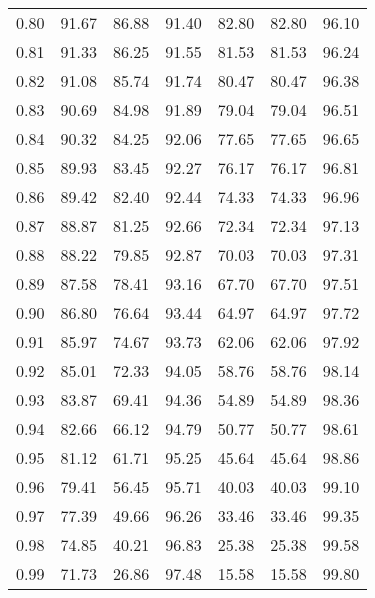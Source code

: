 \begin{tabular}{|c|c|c|c|c|c|c|}
      0.80 &     91.67 &     86.88 &      91.40 &   82.80 &      82.80 &         96.10 \\
      0.81 &     91.33 &     86.25 &      91.55 &   81.53 &      81.53 &         96.24 \\
      0.82 &     91.08 &     85.74 &      91.74 &   80.47 &      80.47 &         96.38 \\
      0.83 &     90.69 &     84.98 &      91.89 &   79.04 &      79.04 &         96.51 \\
      0.84 &     90.32 &     84.25 &      92.06 &   77.65 &      77.65 &         96.65 \\
      0.85 &     89.93 &     83.45 &      92.27 &   76.17 &      76.17 &         96.81 \\
      0.86 &     89.42 &     82.40 &      92.44 &   74.33 &      74.33 &         96.96 \\
      0.87 &     88.87 &     81.25 &      92.66 &   72.34 &      72.34 &         97.13 \\
      0.88 &     88.22 &     79.85 &      92.87 &   70.03 &      70.03 &         97.31 \\
      0.89 &     87.58 &     78.41 &      93.16 &   67.70 &      67.70 &         97.51 \\
      0.90 &     86.80 &     76.64 &      93.44 &   64.97 &      64.97 &         97.72 \\
      0.91 &     85.97 &     74.67 &      93.73 &   62.06 &      62.06 &         97.92 \\
      0.92 &     85.01 &     72.33 &      94.05 &   58.76 &      58.76 &         98.14 \\
      0.93 &     83.87 &     69.41 &      94.36 &   54.89 &      54.89 &         98.36 \\
      0.94 &     82.66 &     66.12 &      94.79 &   50.77 &      50.77 &         98.61 \\
      0.95 &     81.12 &     61.71 &      95.25 &   45.64 &      45.64 &         98.86 \\
      0.96 &     79.41 &     56.45 &      95.71 &   40.03 &      40.03 &         99.10 \\
      0.97 &     77.39 &     49.66 &      96.26 &   33.46 &      33.46 &         99.35 \\
      0.98 &     74.85 &     40.21 &      96.83 &   25.38 &      25.38 &         99.58 \\
      0.99 &     71.73 &     26.86 &      97.48 &   15.58 &      15.58 &         99.80 \\
\bottomrule
\end{tabular}
